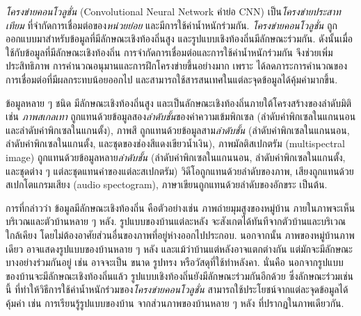 
\textit{โครงข่ายคอนโวลูชั่น} (Convolutional Neural Network คำย่อ CNN)
%
เป็น\textit{โครงข่ายประสาทเทียม}
ที่จำกัดการเชื่อมต่อของ\textit{หน่วยย่อย}
และมีการใช้ค่าน้ำหนักร่วมกัน. 
\textit{โครงข่ายคอนโวลูชั่น} ถูกออกแบบมาสำหรับข้อมูลที่มีลักษณะเชิงท้องถิ่นสูง
และรูปแบบเชิงท้องถิ่นมีลักษณะร่วมกัน.
ดังนั้นเมื่อใช้กับข้อมูลที่มีลักษณะเชิงท้องถิ่น
การจำกัดการเชื่อมต่อและการใช้ค่าน้ำหนักร่วมกัน
จึงช่วยเพิ่มประสิทธิภาพ
การคำนวณอนุมานและการฝึกโครงข่ายขึ้นอย่างมาก
เพราะ
ได้ลดภาระการคำนวณของการเชื่อมต่อที่มีผลกระทบน้อยออกไป
และสามารถใช้สารสนเทศในแต่ละจุดข้อมูลได้คุ้มค่ามากขึ้น.

ข้อมูลหลาย ๆ ชนิด มีลักษณะเชิงท้องถิ่นสูง
และเป็นลักษณะเชิงท้องถิ่นภายใต้โครงสร้างของลำดับมิติ เช่น \textit{ภาพสเกลเทา}
ถูกแทนด้วยข้อมูลสอง\textit{ลำดับชั้น}ของค่าความเข้มพิกเซล (ลำดับค่าพิกเซลในแกนนอน และลำดับค่าพิกเซลในแกนตั้ง), 
ภาพสี ถูกแทนด้วยข้อมูลสาม\textit{ลำดับชั้น}
(ลำดับค่าพิกเซลในแกนนอน, 
ลำดับค่าพิกเซลในแกนตั้ง, และชุดของช่องสีแดงเขียวน้ำเงิน),
ภาพมัลติสเปกตรัม (multispectral image)
ถูกแทนด้วยข้อมูลหลาย\textit{ลำดับชั้น}
(ลำดับค่าพิกเซลในแกนนอน, 
ลำดับค่าพิกเซลในแกนตั้ง, และชุดต่าง ๆ แต่ละชุดแทนค่าของแต่ละสเปกตรัม)
วิดีโอถูกแทนด้วยลำดับของภาพ,
เสียงถูกแทนด้วยสเปกโตแกรมเสียง (audio spectogram),
ภาษาเขียนถูกแทนด้วยลำดับของอักขระ เป็นต้น.

การที่กล่าวว่า ข้อมูลมีลักษณะเชิงท้องถิ่น
คือตัวอย่างเช่น ภาพถ่ายมุมสูงของหมู่บ้าน
ภายในภาพจะเห็นบริเวณและตัวบ้านหลาย ๆ หลัง.
รูปแบบของบ้านแต่ละหลัง จะสังเกตได้ทันทีจากตัวบ้านและบริเวณใกล้เคียง โดยไม่ต้องอาศัยส่วนอื่นของภาพที่อยู่ห่างออกไปประกอบ.
นอกจากนั้น ภาพของหมู่บ้านภาพเดียว
อาจแสดงรูปแบบของบ้านหลาย ๆ หลัง
และแม้ว่าบ้านแต่หลังอาจแตกต่างกัน
แต่มักจะมีลักษณะบางอย่างร่วมกันอยู่ เช่น อาจจะเป็น ขนาด รูปทรง หรือวัสดุที่ใช้ทำหลังคา.
นั่นคือ นอกจากรูปแบบของบ้านจะมีลักษณะเชิงท้องถิ่นแล้ว
รูปแบบเชิงท้องถิ่นยังมีลักษณะร่วมกันอีกด้วย
ซึ่งลักษณะร่วมเช่นนี้ 
ที่ทำให้วิธีการใช้ค่าน้ำหนักร่วมของ\textit{โครงข่ายคอนโวลูชั่น}
สามารถใช้ประโยชน์จากแต่ละจุดข้อมูลได้คุ้มค่า
เช่น การเรียนรู้รูปแบบของบ้าน จากส่วนภาพของบ้านหลาย ๆ หลัง ที่ปรากฏในภาพเดียวกัน.

